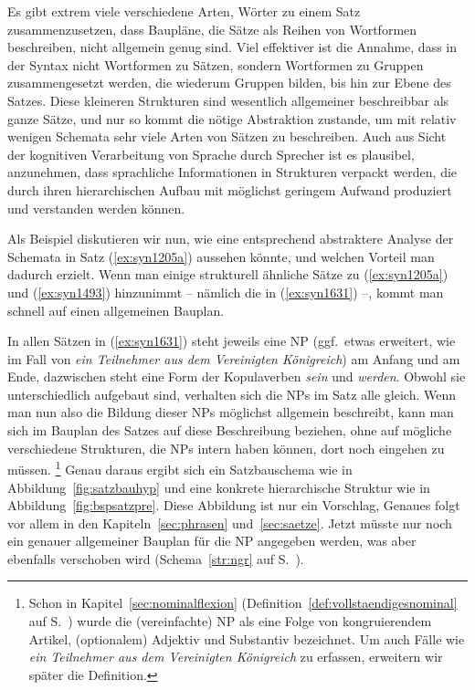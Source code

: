 Es gibt extrem viele verschiedene Arten, Wörter zu einem Satz zusammenzusetzen, dass Baupläne, die Sätze als Reihen von Wortformen beschreiben, nicht allgemein genug sind.
Viel effektiver ist die Annahme, dass in der Syntax nicht Wortformen zu Sätzen, sondern Wortformen zu Gruppen zusammengesetzt werden, die wiederum Gruppen bilden, bis hin zur Ebene des Satzes.
Diese kleineren Strukturen sind wesentlich allgemeiner beschreibbar als ganze Sätze, und nur so kommt die nötige Abstraktion zustande, um mit relativ wenigen Schemata sehr viele Arten von Sätzen zu beschreiben.
Auch aus Sicht der kognitiven Verarbeitung von Sprache durch Sprecher ist es plausibel, anzunehmen, dass sprachliche Informationen in Strukturen verpackt werden, die durch ihren hierarchischen Aufbau mit möglichst geringem Aufwand produziert und verstanden werden können.

Als Beispiel diskutieren wir nun, wie eine entsprechend abstraktere Analyse der Schemata in Satz (\ref{ex:syn1205a}) aussehen könnte, und welchen Vorteil man dadurch erzielt.
Wenn man einige strukturell ähnliche Sätze zu (\ref{ex:syn1205a}) und (\ref{ex:syn1493}) hinzunimmt -- nämlich die in (\ref{ex:syn1631}) --, kommt man schnell auf einen allgemeinen Bauplan.

\begin{exe}
  \ex\label{ex:syn1631}
  \begin{xlist}
  \end{xlist}
\end{exe}

In allen Sätzen in (\ref{ex:syn1631}) steht jeweils eine NP (ggf.\ etwas erweitert, wie im Fall von \textit{ein Teilnehmer aus dem Vereinigten Königreich}) am Anfang und am Ende, dazwischen steht eine Form der Kopulaverben \textit{sein} und \textit{werden}.
Obwohl sie unterschiedlich aufgebaut sind, verhalten sich die NPs im Satz alle gleich.
Wenn man nun also die Bildung dieser NPs möglichst allgemein beschreibt, kann man sich im Bauplan des Satzes auf diese Beschreibung beziehen, ohne auf mögliche verschiedene Strukturen, die NPs intern haben können, dort noch eingehen zu müssen.%
\footnote{Schon in Kapitel~\ref{sec:nominalflexion} (Definition~\ref{def:vollstaendigesnominal} auf S.~\pageref{def:vollstaendigesnominal}) wurde die (vereinfachte) NP als eine Folge von kongruierendem Artikel, (optionalem) Adjektiv und Substantiv bezeichnet.
Um auch Fälle wie \textit{ein Teilnehmer aus dem Vereinigten Königreich} zu erfassen, erweitern wir später die Definition.}
Genau daraus ergibt sich ein Satzbauschema wie in Abbildung~\ref{fig:satzbauhyp} und eine konkrete hierarchische Struktur wie in Abbildung~\ref{fig:bspsatzpre}.
Diese Abbildung ist nur ein Vorschlag, Genaues folgt vor allem in den Kapiteln~\ref{sec:phrasen} und~\ref{sec:saetze}.
Jetzt müsste nur noch ein genauer allgemeiner Bauplan für die NP angegeben werden, was aber ebenfalls verschoben wird (Schema~\ref{str:ngr} auf S.~\pageref{str:ngr}).

